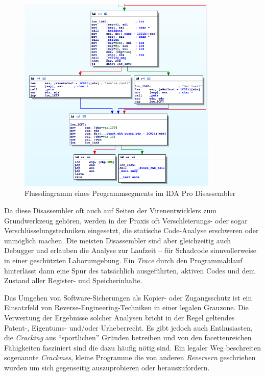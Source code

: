 \begin{figure}[h]
  \begin{center}
    \includegraphics[width=0.85\textwidth]{IDA-pro-flowchart.png}
  \end{center}
  \caption{Flussdiagramm eines Programmsegments im IDA Pro Disassembler}
\end{figure}

Da diese Disassembler oft auch auf Seiten der Virenentwicklers zum Grundwerkzeug gehören, werden in der Praxis oft Verschleierungs- oder sogar Verschlüsselungstechniken eingesetzt, die statische Code-Analyse erschweren oder unmöglich machen. Die meisten Disassembler sind aber gleichzeitig auch Debugger und erlauben die Analyse zur Laufzeit – f\"ur Schadcode sinnvollerweise in einer geschützten Laborumgebung. Ein \emph{Trace} durch den Programmablauf hinterlässt dann eine Spur des tatsächlich ausgeführten, aktiven Codes und dem Zustand aller Register- und Speicherinhalte.

Das Umgehen von Software-Sicherungen als Kopier- oder Zugangsschutz ist ein Einsatzfeld von Reverse-Engineering-Techniken in einer legalen Grauzone. Die Verwertung  der Ergebnisse solcher Analysen bricht in der Regel geltendes Patent-, Eigentums- und/oder Urheberrecht. Es gibt jedoch auch Enthusiasten, die \emph{Cracking} aus ``sportlichen'' Gründen betreiben und von den facettenreichen Fähigkeiten fasziniert sind die dazu häufig nötig sind. Ein legaler Weg beschreiten sogenannte \emph{Crackmes}\cite{crackme}, kleine Programme die von anderen \emph{Reversern} geschrieben wurden um sich gegenseitig auszuprobieren oder herauszufordern.

